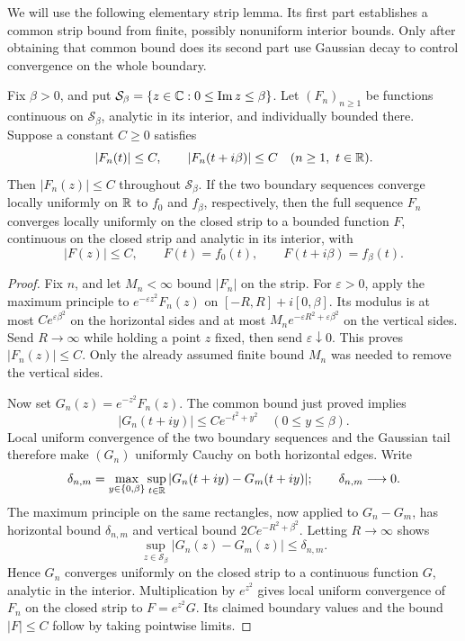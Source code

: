 We will use the following elementary strip lemma.  Its first part
establishes a common strip bound from finite, possibly nonuniform
interior bounds.  Only after obtaining that common bound does its
second part use Gaussian decay to control convergence on the whole
boundary.

\begin{lemma}\label{lem:strip-limit}
Fix \(\beta>0\), and put
\(\mathcal S_\beta=\{z\in\mathbb C:0\leq\operatorname{Im}z\leq\beta\}\).
Let \((F_n)_{n\geq1}\) be functions continuous on
\(\mathcal S_\beta\), analytic in its interior, and individually
bounded there.  Suppose a constant \(C\geq0\) satisfies
\[
 |F_n(t)|\leq C,\qquad |F_n(t+i\beta)|\leq C
 \quad(n\geq1,\ t\in\mathbb R).
\]
Then \(|F_n(z)|\leq C\) throughout \(\mathcal S_\beta\).
If the two boundary sequences converge locally uniformly on \(\mathbb R\)
to \(f_0\) and \(f_\beta\), respectively, then the full sequence
\(F_n\) converges locally uniformly on the closed strip to a bounded
function \(F\), continuous on the closed strip and analytic in its
interior, with
\[
 |F(z)|\leq C,\qquad F(t)=f_0(t),\qquad F(t+i\beta)=f_\beta(t).
\]
\end{lemma}

\begin{proof}
Fix \(n\), and let \(M_n<\infty\) bound \(|F_n|\) on the strip.
For \(\varepsilon>0\), apply the maximum principle to
\(e^{-\varepsilon z^2}F_n(z)\) on
\([-R,R]+i[0,\beta]\).  Its modulus is at most
\(Ce^{\varepsilon\beta^2}\) on the horizontal sides and at most
\(M_ne^{-\varepsilon R^2+\varepsilon\beta^2}\) on the vertical
sides.  Send \(R\to\infty\) while holding a point \(z\) fixed,
then send \(\varepsilon\downarrow0\).  This proves
\(|F_n(z)|\leq C\).  Only the already assumed finite bound
\(M_n\) was needed to remove the vertical sides.

Now set \(G_n(z)=e^{-z^2}F_n(z)\).  The common bound just proved
implies
\[
 |G_n(t+iy)|\leq Ce^{-t^2+y^2}
       \quad(0\leq y\leq\beta).
\]
Local uniform convergence of the two boundary sequences and the
Gaussian tail therefore make \((G_n)\) uniformly Cauchy on both
horizontal edges.  Write
\[
 \delta_{n,m}=
 \max_{y\in\{0,\beta\}}\sup_{t\in\mathbb R}
           |G_n(t+iy)-G_m(t+iy)|;
 \qquad \delta_{n,m}\longrightarrow0.
\]
The maximum principle on the same rectangles, now applied to
\(G_n-G_m\), has horizontal bound \(\delta_{n,m}\) and vertical
bound \(2Ce^{-R^2+\beta^2}\).  Letting \(R\to\infty\) shows
\[
 \sup_{z\in\mathcal S_\beta}|G_n(z)-G_m(z)|\leq\delta_{n,m}.
\]
Hence \(G_n\) converges uniformly on the closed strip to a
continuous function \(G\), analytic in the interior.  Multiplication
by \(e^{z^2}\) gives local uniform convergence of \(F_n\) on the
closed strip to \(F=e^{z^2}G\).  Its claimed boundary values and
the bound \(|F|\leq C\) follow by taking pointwise limits.
\end{proof}

